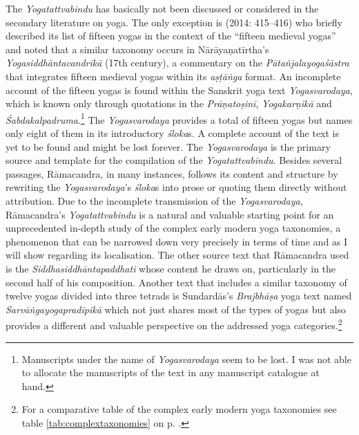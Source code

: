 The \textit{Yogatattvabindu} has basically not been discussed or considered in the secondary literature on yoga. The only exception is \citeauthor{birch2014} (2014: 415–416) who briefly described its list of fifteen yogas in the context of the ``fifteen medieval yogas'' and noted that a similar taxonomy occurs in Nārāyaṇatīrtha’s \textit{Yogasiddhāntacandrikā} (17th century), a commentary on the \textit{Pātañjalayogaśāstra} that integrates fifteen medieval yogas within its \textit{aṣṭāṅga} format. An incomplete account of the fifteen yogas is found within the Sanskrit yoga text \textit{Yogasvarodaya}, which is known only through quotations in the \textit{Prāṇatoṣinī}, \textit{Yogakarṇikā} and \emph{Śabdakalpadruma}.\footnote{Manuscripts under the name of \textit{Yogasvarodaya} seem to be lost. I was not able to allocate the manuscripts of the text in any manuscript catalogue at hand.} The \textit{Yogasvarodaya} provides a total of fifteen yogas but names only eight of them in its introductory \textit{śloka}s. A complete account of the text is yet to be found and might be lost forever. The \textit{Yogasvarodaya} is the primary source and template for the compilation of the \textit{Yogatattvabindu}. Besides several passages, Rāmacandra, in many instances, follows its content and structure by rewriting the \textit{Yogasvarodaya}’s \textit{śloka}s into prose or quoting them directly without attribution. Due to the incomplete transmission of the \textit{Yogasvarodaya}, Rāmacandra’s \textit{Yogatattvabindu} is a natural and valuable starting point for an unprecedented in-depth study of the complex early modern yoga taxonomies, a phenomenon that can be narrowed down very precisely in terms of time and as I will show regarding its localisation. The other source text that Rāmacandra used is the \textit{Siddhasiddhāntapaddhati} whose content he draws on, particularly in the second half of his composition. Another text that includes a similar taxonomy of twelve yogas divided into three tetrads is Sundardās’s \textit{Brajbhāṣa} yoga text named \textit{Sarvāṅgayogapradīpikā} which not just shares most of the types of yogas but also provides a different and valuable perspective on the addressed yoga categories.\footnote{For a comparative table of the complex early modern yoga taxonomies see table \ref{tab:complextaxonomies} on p. \pageref{tab:complextaxonomies}.}

